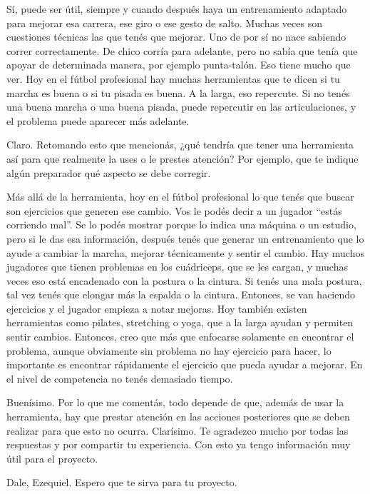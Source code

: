 \begin{description}[leftmargin=0pt, itemindent=\parindent, labelsep=0.5em, itemsep=0pt, parsep=0pt, topsep=0pt]
    \item[\textbf{Sebastián López:}] Sí, puede ser útil, siempre y cuando después haya un entrenamiento adaptado para mejorar esa carrera, ese giro o ese gesto de salto. Muchas veces son cuestiones técnicas las que tenés que mejorar. Uno de por sí no nace sabiendo correr correctamente. De chico corría para adelante, pero no sabía que tenía que apoyar de determinada manera, por ejemplo punta-talón. Eso tiene mucho que ver. Hoy en el fútbol profesional hay muchas herramientas que te dicen si tu marcha es buena o si tu pisada es buena. A la larga, eso repercute. Si no tenés una buena marcha o una buena pisada, puede repercutir en las articulaciones, y el problema puede aparecer más adelante.

    \item[\textbf{Entrevistador:}] Claro. Retomando esto que mencionás, ¿qué tendría que tener una herramienta así para que realmente la uses o le prestes atención? Por ejemplo, que te indique algún preparador qué aspecto se debe corregir.

    \item[\textbf{Sebastián López:}] Más allá de la herramienta, hoy en el fútbol profesional lo que tenés que buscar son ejercicios que generen ese cambio. Vos le podés decir a un jugador ``estás corriendo mal''. Se lo podés mostrar porque lo indica una máquina o un estudio, pero si le das esa información, después tenés que generar un entrenamiento que lo ayude a cambiar la marcha, mejorar técnicamente y sentir el cambio. Hay muchos jugadores que tienen problemas en los cuádriceps, que se les cargan, y muchas veces eso está encadenado con la postura o la cintura. Si tenés una mala postura, tal vez tenés que elongar más la espalda o la cintura. Entonces, se van haciendo ejercicios y el jugador empieza a notar mejoras. Hoy también existen herramientas como pilates, stretching o yoga, que a la larga ayudan y permiten sentir cambios. Entonces, creo que más que enfocarse solamente en encontrar el problema, aunque obviamente sin problema no hay ejercicio para hacer, lo importante es encontrar rápidamente el ejercicio que pueda ayudar a mejorar. En el nivel de competencia no tenés demasiado tiempo.

    \item[\textbf{Entrevistador:}] Buenísimo. Por lo que me comentás, todo depende de que, además de usar la herramienta, hay que prestar atención en las acciones posteriores que se deben realizar para que esto no ocurra. Clarísimo. Te agradezco mucho por todas las respuestas y por compartir tu experiencia. Con esto ya tengo información muy útil para el proyecto.

    \item[\textbf{Sebastián López:}] Dale, Ezequiel. Espero que te sirva para tu proyecto.
\end{description}


